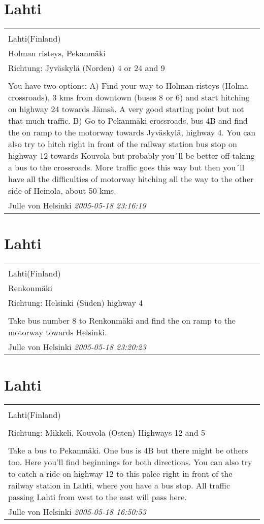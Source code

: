 \documentclass[a4paper,12pt]{article}
\begin{document}
\section{Lahti}
\begin{tabular}{|p{13cm}|}
\hline\\
Lahti(Finland)\\
Holman risteys, Pekanmäki\\
Richtung: Jyväskylä (Norden) 4 or 24 and 9 \\
\hline\\
You have two options:
A) Find your way to Holman risteys (Holma crossroads), 3 kms from downtown (buses 8 or 6) and start hitching on highway 24 towards Jämsä. A very good starting point but not that much traffic.
B) Go to Pekanmäki crossroads, bus 4B and find the on ramp to the motorway towards Jyväskylä, highway 4. You can also try to hitch right in front of the railway station bus stop on highway 12 towards Kouvola but probably you´ll be better off taking a bus to the crossroads. More traffic goes this way but then you´ll have all the difficulties of motorway hitching all the way to the other side of Heinola, about 50 kms. \\
Julle von Helsinki \textit{ 2005-05-18 23:16:19 }\\\hline
\end{tabular}


\section{Lahti}
\begin{tabular}{|p{13cm}|}
\hline\\
Lahti(Finland)\\
Renkonmäki\\
Richtung: Helsinki (Süden) highway 4 \\
\hline\\
Take bus number 8 to Renkonmäki and find the on ramp to the motorway towards Helsinki. \\
Julle von Helsinki \textit{ 2005-05-18 23:20:23 }\\\hline
\end{tabular}


\section{Lahti}
\begin{tabular}{|p{13cm}|}
\hline\\
Lahti(Finland)\\
\\
Richtung: Mikkeli, Kouvola (Osten) Highways 12 and 5 \\
\hline\\
Take a bus to Pekanmäki. One bus is 4B but there might be others too. Here you'll find beginnings for both directions.
You can also try to catch a ride on highway 12 to this palce right in front of the railway station in Lahti, where you have a bus stop. All traffic passing Lahti from west to the east will pass here. \\
Julle von Helsinki \textit{ 2005-05-18 16:50:53 }\\\hline
\end{tabular}
\end{document}
